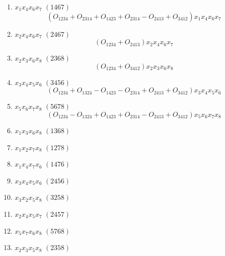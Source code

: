 \documentclass[aps,preprint]{revtex4}%
\begin{document}
\begin{enumerate}
\begin{enumerate}
\item $x_{1}x_{4}x_{6}x_{7}$ $\left(  1467\right)  $%
\begin{equation}
\left(  \overset{}{O_{1234}+O_{2314}+O_{1423}+O_{2314}-O_{2413}+O_{3412}%
}\right)  x_{1}x_{4}x_{6}x_{7}%
\end{equation}


\item $x_{2}x_{4}x_{6}x_{7}$ $\left(  2467\right)  $%
\begin{equation}
\left(  O_{1234}+O_{2413}\right)  x_{2}x_{4}x_{6}x_{7}%
\end{equation}


\item $x_{2}x_{3}x_{6}x_{8}$ $\left(  2368\right)  $%
\begin{equation}
\left(  O_{1234}+O_{3412}\right)  x_{2}x_{3}x_{6}x_{8}%
\end{equation}


\item $x_{3}x_{4}x_{5}x_{6}$ $\left(  3456\right)  $%
\begin{equation}
\left(  O_{1234}+O_{1324}-O_{1423}-O_{2314}+O_{2413}+O_{3412}\right)
x_{3}x_{4}x_{5}x_{6}%
\end{equation}


\item $x_{5}x_{6}x_{7}x_{8}$ $\left(  5678\right)  $%
\begin{equation}
\left(  O_{1234}-O_{1324}+O_{1423}+O_{2314}-O_{2413}+O_{3412}\right)
x_{5}x_{6}x_{7}x_{8}%
\end{equation}


\item $x_{1}x_{3}x_{6}x_{8}$ $\left(  1368\right)  $

\item $x_{1}x_{2}x_{7}x_{8}$ $\left(  1278\right)  $

\item $x_{1}x_{4}x_{7}x_{6}$ $\left(  1476\right)  $

\item $x_{3}x_{4}x_{5}x_{6}$ $\left(  2456\right)  $

\item $x_{3}x_{2}x_{5}x_{8}$ $\left(  3258\right)  $

\item $x_{2}x_{4}x_{5}x_{7}$ $\left(  2457\right)  $

\item $x_{5}x_{7}x_{6}x_{8}$ $\left(  5768\right)  $

\item $x_{2}x_{3}x_{5}x_{8}$ $\left(  2358\right)  $


\end{enumerate}
\end{enumerate}
\end{document}
